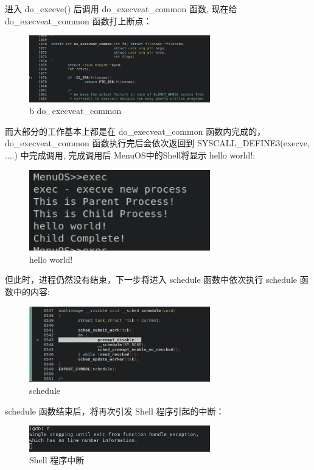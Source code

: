 \documentclass[lang=cn,10pt]{elegantbook}
\begin{document}
\newpage
进入 do\_execve()  后调用 do\_execveat\_common 函数, 现在给do\_execveat\_common 函数打上断点：
\begin{figure}[htbp]
  \centering
  \includegraphics[width=0.7\textwidth]{image/image-20231109165917824.png}
  \caption{b do\_execveat\_common }
\end{figure}


而大部分的工作基本上都是在 do\_execveat\_common 函数内完成的，do\_execveat\_common 函数执行完后会依次返回到 SYSCALL\_DEFINE3(execve, ....)  中完成调用, 完成调用后 MenuOS中的Shell将显示 hello world!:
\begin{figure}[htbp]
  \centering
  \includegraphics[width=0.7\textwidth]{image/image-20231109165138037.png}
  \caption{hello world!}
\end{figure}


但此时，进程仍然没有结束，下一步将进入 schedule 函数中依次执行 schedule 函数中的内容:
\begin{figure}[htbp]
  \centering
  \includegraphics[width=0.7\textwidth]{image/image-20231109164729388.png}
  \caption{schedule}
\end{figure}

\newpage
schedule 函数结束后，将再次引发 Shell 程序引起的中断：
\begin{figure}[htbp]
  \centering
  \includegraphics[width=0.7\textwidth]{image/image-20231109170505625.png}
  \caption{Shell 程序中断}
\end{figure}
\end{document}

